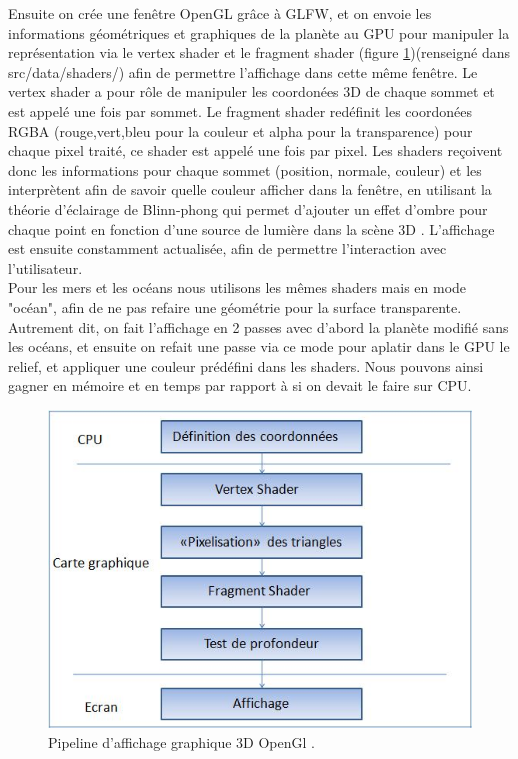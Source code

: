 \documentclass[a4paper]{article}
\begin{document}
Ensuite on crée une fenêtre OpenGL grâce à GLFW, et on envoie les informations géométriques et graphiques de la planète au GPU pour manipuler la représentation via le vertex shader et le fragment shader (figure \ref{shader_theory})(renseigné dans src/data/shaders/) afin de permettre l'affichage dans cette même fenêtre. Le vertex shader a pour rôle de manipuler les coordonées 3D de chaque sommet et est appelé une fois par sommet. Le fragment shader redéfinit les coordonées RGBA (rouge,vert,bleu pour la couleur et alpha pour la transparence) pour chaque pixel traité, ce shader est appelé une fois par pixel. Les shaders reçoivent donc les informations pour chaque sommet (position, normale, couleur) et les interprètent afin de savoir quelle couleur afficher dans la fenêtre, en utilisant la théorie d'éclairage de Blinn-phong qui permet d'ajouter un effet d'ombre pour chaque point en fonction d'une source de lumière dans la scène 3D \cite{BlinnPhong}. L'affichage est ensuite constamment actualisée, afin de permettre l'interaction avec l'utilisateur.\\
Pour les mers et les océans nous utilisons les mêmes shaders mais en mode "océan", afin de ne pas refaire une géométrie pour la surface transparente. Autrement dit, on fait l'affichage en 2 passes avec d'abord la planète modifié sans les océans, et ensuite on refait une passe via ce mode pour aplatir dans le GPU le relief, et appliquer une couleur prédéfini dans les shaders. Nous pouvons ainsi gagner en mémoire et en temps par rapport à si on devait le faire sur CPU.

\begin{figure}[!ht]
        \begin{center} \includegraphics[width=0.8\linewidth]{img/archi/shader_theory.jpg} \end{center}
        \caption{\label{shader_theory}Pipeline d'affichage graphique 3D OpenGl \protect\footnotemark .}
\end{figure}
\end{document}

